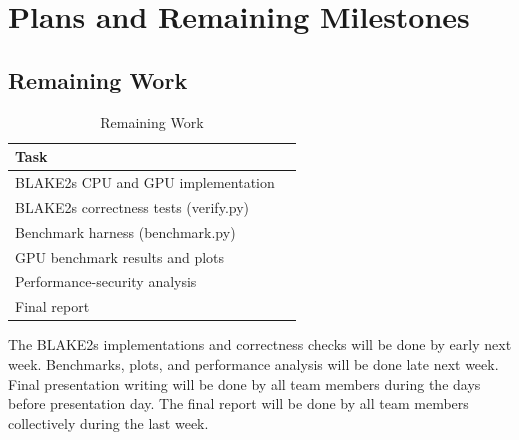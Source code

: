 \documentclass[12pt]{article}
\begin{document}
\section{Plans and Remaining Milestones}
\subsection{Remaining Work}

\begin{table}[H]
\centering
\begin{tabular}{ll}
\toprule
\textbf{Task}\\
\midrule
BLAKE2s CPU and GPU implementation\\
BLAKE2s correctness tests (verify.py)\\
Benchmark harness (benchmark.py)\\
GPU benchmark results and plots\\
Performance-security analysis\\
Final report\\
\bottomrule
\end{tabular}
\caption{Remaining Work}
\label{tab:division}
\end{table}

The BLAKE2s implementations and correctness checks will be done by early next week. Benchmarks, plots, and performance analysis will be done late next week. Final presentation writing will be done by all team members during the days before presentation day. The final report will be done by all team members collectively during the last week.
\end{document}
